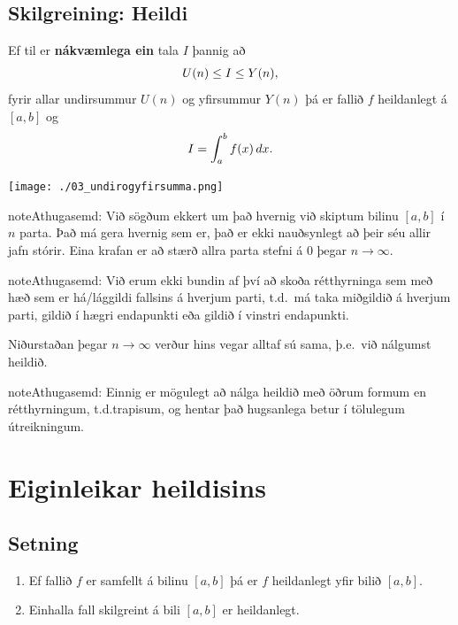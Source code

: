 \documentclass[a4paper,10pt,icelandic]{sphinxmanual}
\begin{document}
\subsection{Skilgreining: Heildi}
\label{kafli06:skilgreining-heildi}
Ef til er \textbf{nákvæmlega ein} tala \(I\) þannig að
\begin{gather}
\begin{split}U(n) \leq I \leq Y(n),\end{split}\notag
\end{gather}
fyrir allar undirsummur \(U(n)\) og yfirsummur \(Y(n)\) þá er
fallið \(f\) heildanlegt á \([a,b]\) og
\begin{gather}
\begin{split}I = \int_a^b f(x)\, dx.\end{split}\notag
\end{gather}

\begin{center}
\texttt{[image: ./03\_undirogyfirsumma.png]}
\end{center}


\begin{notice}{note}{Athugasemd:}
Við sögðum ekkert um það hvernig við skiptum bilinu \([a,b]\) í
\(n\) parta. Það má gera hvernig sem er, það er ekki nauðsynlegt að
þeir séu allir jafn stórir. Eina krafan er að stærð allra parta stefni á
0 þegar \(n\to \infty\).
\end{notice}

\begin{notice}{note}{Athugasemd:}
Við erum ekki bundin af því að skoða rétthyrninga sem með hæð sem er
há/lággildi fallsins á hverjum parti, t.d. má taka miðgildið á hverjum
parti, gildið í hægri endapunkti eða gildið í vinstri endapunkti.

Niðurstaðan þegar \(n\to \infty\) verður hins vegar alltaf sú sama,
þ.e. við nálgumst heildið.
\end{notice}

\begin{notice}{note}{Athugasemd:}
Einnig er mögulegt að nálga heildið með öðrum formum en rétthyrningum,
t.d.trapisum, og hentar það hugsanlega betur í
tölulegum útreikningum.
\end{notice}


\section{Eiginleikar heildisins}
\label{kafli06:eiginleikar-heildisins}

\subsection{Setning}
\label{kafli06:setning}\begin{enumerate}
\item {} 
Ef fallið \(f\) er samfellt á bilinu \([a, b]\) þá er
\(f\) heildanlegt yfir bilið \([a, b]\).

\item {} 
Einhalla fall skilgreint á bili \([a,b]\) er heildanlegt.

\end{enumerate}
\end{document}
